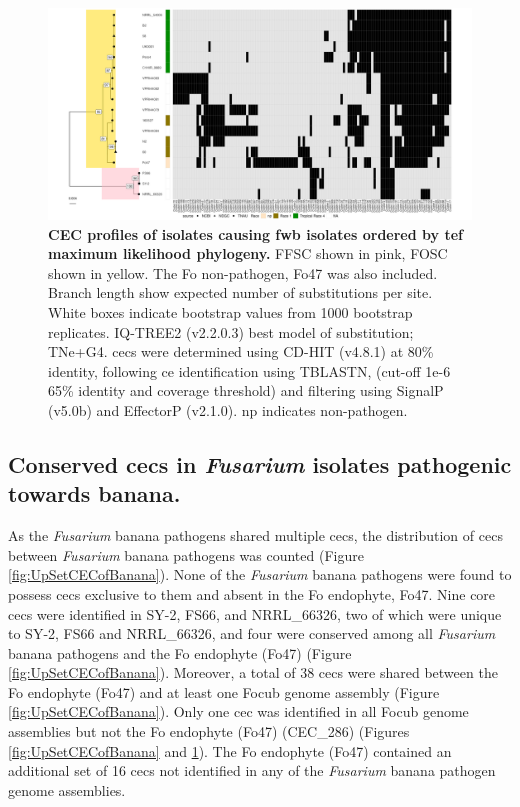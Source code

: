 \begin{figure}
    \centering
    \includegraphics[width=\textwidth]{Figures/HeatmapAndPhylo_BananaPathOnly.png}
    \captionsetup{width=24cm}
    \caption[CEC profiles of isolates  causing \acl{fwb} isolates ordered by maximum likelihood phylogeny.]{\textbf{CEC profiles of isolates  causing \acl{fwb} isolates ordered by \ac{tef} maximum likelihood phylogeny.} \ac{FFSC} shown in pink, \ac{FOSC} shown in yellow. The \ac{Fo} non-pathogen, Fo47 was also included. Branch length show expected number of substitutions per site. White boxes indicate bootstrap values from 1000 bootstrap replicates. IQ-TREE2 (v2.2.0.3) best model of substitution; TNe+G4. \Acp{cec} were determined using CD-HIT (v4.8.1) at 80\% identity, following \ac{ce} identification using TBLASTN, (cut-off 1e-6 65\% identity and coverage threshold) and filtering using SignalP (v5.0b) and EffectorP (v2.1.0). np indicates non-pathogen.}
    \label{fig:MaeiHeatmap-banana}
\end{figure}

\subsection{Conserved \aclp{cec} in \textit{Fusarium} isolates pathogenic towards banana.} 

As the \textit{Fusarium} banana pathogens shared multiple \acp{cec}, the distribution of \acp{cec} between \textit{Fusarium} banana pathogens was counted (Figure \ref{fig:UpSetCECofBanana}). None of the \textit{Fusarium} banana pathogens were found to possess \acp{cec} exclusive to them and absent in the \ac{Fo} endophyte, Fo47. Nine core \acp{cec} were identified in SY-2, FS66, and NRRL\_66326, two of which were unique to SY-2,  FS66 and NRRL\_66326, and four were conserved among all \textit{Fusarium} banana pathogens and the \ac{Fo} endophyte (Fo47) (Figure \ref{fig:UpSetCECofBanana}). Moreover, a total of 38 \acp{cec} were shared between the \ac{Fo} endophyte (Fo47) and at least one \ac{Focub} genome assembly (Figure \ref{fig:UpSetCECofBanana}). Only one \ac{cec} was identified in all \ac{Focub} genome assemblies but not the \ac{Fo} endophyte (Fo47) (CEC\_286) (Figures \ref{fig:UpSetCECofBanana} and \ref{fig:MaeiHeatmap-banana}). The \ac{Fo} endophyte (Fo47) contained an additional set of 16 \acp{cec} not identified in any of the \textit{Fusarium} banana pathogen genome assemblies.

